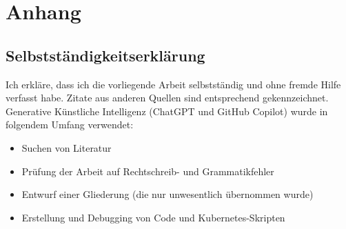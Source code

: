 \documentclass[11pt,a4paper]{article}
\begin{document}

\section{Anhang}
\subsection{Selbstständigkeitserklärung}
Ich erkläre, dass ich die vorliegende Arbeit selbstständig und ohne fremde Hilfe verfasst habe.
Zitate aus anderen Quellen sind entsprechend gekennzeichnet.
Generative Künstliche Intelligenz (ChatGPT und GitHub Copilot) wurde in folgendem Umfang verwendet:
\begin{itemize}
	\item Suchen von Literatur
	\item Prüfung der Arbeit auf Rechtschreib- und Grammatikfehler
	\item Entwurf einer Gliederung (die nur unwesentlich übernommen wurde)
	\item Erstellung und Debugging von Code und Kubernetes-Skripten
\end{itemize}

\printbibliography
\end{document}
